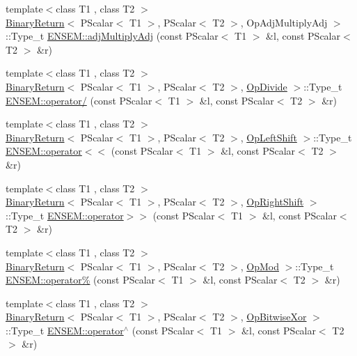 \begin{DoxyCompactItemize}
\item 
{\footnotesize template$<$class T1 , class T2 $>$ }\\\mbox{\hyperlink{structBinaryReturn}{Binary\+Return}}$<$ P\+Scalar$<$ T1 $>$, P\+Scalar$<$ T2 $>$, Op\+Adj\+Multiply\+Adj $>$\+::Type\+\_\+t \mbox{\hyperlink{group__primscalar_gaefec03134414f1f7c36b09b92cf9570b}{E\+N\+S\+E\+M\+::adj\+Multiply\+Adj}} (const P\+Scalar$<$ T1 $>$ \&l, const P\+Scalar$<$ T2 $>$ \&r)
\item 
{\footnotesize template$<$class T1 , class T2 $>$ }\\\mbox{\hyperlink{structBinaryReturn}{Binary\+Return}}$<$ P\+Scalar$<$ T1 $>$, P\+Scalar$<$ T2 $>$, \mbox{\hyperlink{structOpDivide}{Op\+Divide}} $>$\+::Type\+\_\+t \mbox{\hyperlink{group__primscalar_ga45ba7920db563ad713c3977adc283ede}{E\+N\+S\+E\+M\+::operator/}} (const P\+Scalar$<$ T1 $>$ \&l, const P\+Scalar$<$ T2 $>$ \&r)
\item 
{\footnotesize template$<$class T1 , class T2 $>$ }\\\mbox{\hyperlink{structBinaryReturn}{Binary\+Return}}$<$ P\+Scalar$<$ T1 $>$, P\+Scalar$<$ T2 $>$, \mbox{\hyperlink{structOpLeftShift}{Op\+Left\+Shift}} $>$\+::Type\+\_\+t \mbox{\hyperlink{group__primscalar_ga39d346ef6c678a5a37348a5a403e955d}{E\+N\+S\+E\+M\+::operator$<$$<$}} (const P\+Scalar$<$ T1 $>$ \&l, const P\+Scalar$<$ T2 $>$ \&r)
\item 
{\footnotesize template$<$class T1 , class T2 $>$ }\\\mbox{\hyperlink{structBinaryReturn}{Binary\+Return}}$<$ P\+Scalar$<$ T1 $>$, P\+Scalar$<$ T2 $>$, \mbox{\hyperlink{structOpRightShift}{Op\+Right\+Shift}} $>$\+::Type\+\_\+t \mbox{\hyperlink{group__primscalar_ga85954268175e1f847049ff341c964518}{E\+N\+S\+E\+M\+::operator$>$$>$}} (const P\+Scalar$<$ T1 $>$ \&l, const P\+Scalar$<$ T2 $>$ \&r)
\item 
{\footnotesize template$<$class T1 , class T2 $>$ }\\\mbox{\hyperlink{structBinaryReturn}{Binary\+Return}}$<$ P\+Scalar$<$ T1 $>$, P\+Scalar$<$ T2 $>$, \mbox{\hyperlink{structOpMod}{Op\+Mod}} $>$\+::Type\+\_\+t \mbox{\hyperlink{group__primscalar_ga628b45b47db0fad40e96f41b255fe161}{E\+N\+S\+E\+M\+::operator\%}} (const P\+Scalar$<$ T1 $>$ \&l, const P\+Scalar$<$ T2 $>$ \&r)
\item 
{\footnotesize template$<$class T1 , class T2 $>$ }\\\mbox{\hyperlink{structBinaryReturn}{Binary\+Return}}$<$ P\+Scalar$<$ T1 $>$, P\+Scalar$<$ T2 $>$, \mbox{\hyperlink{structOpBitwiseXor}{Op\+Bitwise\+Xor}} $>$\+::Type\+\_\+t \mbox{\hyperlink{group__primscalar_ga86ae67deb84332c9b2cadb6d1f7149f2}{E\+N\+S\+E\+M\+::operator$^\wedge$}} (const P\+Scalar$<$ T1 $>$ \&l, const P\+Scalar$<$ T2 $>$ \&r)

\end{DoxyCompactItemize}
